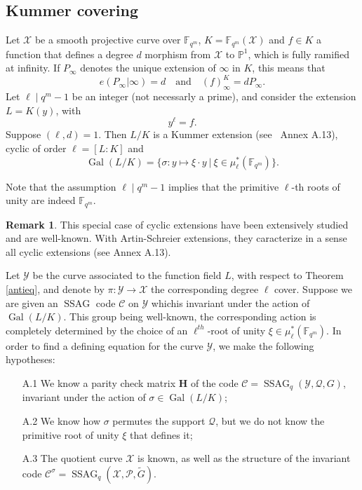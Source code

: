 \documentclass[10pt]{article}
\theoremstyle{definition}
\newtheorem{rq1}[thm]{Remark}
\theoremstyle{definition}
\theoremstyle{definition}
\newcommand{\cd}{\cdot}
\newcommand{\Fqm}{\mathbb{F}_{q^m}}
\newcommand{\X}{\mathcal{X}}
\newcommand{\Y}{\mathcal{Y}}
\newcommand{\PR}{\mathcal{P}}
\newcommand{\QR}{\mathcal{Q}}
\newcommand{\Gal}{\operatorname{Gal}}
\newcommand{\ssag}{\operatorname{SSAG}}
\begin{document}
\subsection{Kummer covering} \label{sectionkummer}

Let $\X$ be a smooth projective curve over $\mathbb{F}_{q^m}$, $K=\mathbb{F}_{q^m}(\X)$ and $f \in K$ a function that defines a degree $d$ morphism from $\X$ to $\mathbb{P}^1$, which is fully ramified at infinity. If $P_{\infty}$ denotes the unique extension of $\infty$ in $K$, this means that 
\[ e(P_{\infty}|\infty)=d \quad \mathrm{and} \quad (f)^K_{\infty} = dP_{\infty}.\] 
Let $\ell \mid q^m-1$ be an integer (not necessarly a prime), and consider the extension $L=K(y)$, with
\begin{equation} \label{kummer}
y^{\ell} = f. 
\end{equation}
Suppose $(\ell,d)=1$. Then $L/K$ is a Kummer extension (see~\cite{Sti} Annex A.13), cyclic of order $\ell=[L:K]$ and 
\[\Gal(L/K) = \{ \sigma : y \mapsto \xi \cd y \ | \ \xi \in \mu^*_{\ell}(\Fqm)\}.\] 

Note that the assumption $\ell \mid q^m-1$ implies that the primitive $\ell$-th roots of unity are indeed $\mathbb{F}_{q^m}$.

\begin{rq1} \label{pk des polynomes}
This special case of cyclic extensions have been extensively studied and are well-known. With Artin-Schreier extensions, they caracterize in a sense all cyclic extensions (see \cite{Sti} Annex A.13).
\end{rq1}

Let $\Y$ be the curve associated to the function field $L$, with respect to Theorem \ref{antieq}, and denote by $\pi : \Y \longrightarrow \X$ the corresponding degree $\ell$ cover. Suppose we are given an $\ssag$ code $\mathcal{C}$ on $\Y$ whichis invariant under the action of $\Gal(L/K)$.
This group being well-known, the corresponding action is completely determined by the choice of an $\ell^{th}$-root of unity $\xi \in \mu^*_{\ell}(\Fqm)$. In order to find a defining equation for the curve $\Y$, we make the following hypotheses:

\begin{enumerate}
\item[A.1] We know a parity check matrix $\mathbf{H}$ of the code $\mathcal{C} = \ssag_q(\Y,\QR,G)$, invariant under the action of $\sigma \in \Gal(L/K)$;
\item[A.2] We know how $\sigma$ permutes the support $\QR$, but we do not know the primitive root of unity $\xi$ that defines it;
\item[A.3] The quotient curve $\X$ is known, as well as the structure of the invariant code $\mathcal{C}^{\sigma} = \ssag_q(\X,\PR,\tilde{G})$.
\end{enumerate}
\end{document}
